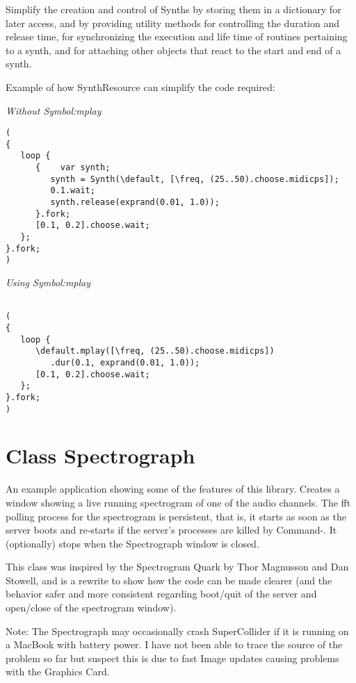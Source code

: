 \documentclass[11pt, a4paper]{scrartcl}
\begin{document}
Simplify the creation and control of Synths by storing them in a dictionary for later access, and by providing utility methods for
controlling the duration and release time, for synchronizing the execution and life time of routines pertaining to a synth, and for attaching other objects that react to the start and end of a synth.

Example of how SynthResource can simplify the code required: 

\emph{Without Symbol:mplay}

\begin{verbatim}
(
{
   loop {
      {    var synth;
         synth = Synth(\default, [\freq, (25..50).choose.midicps]);
         0.1.wait;
         synth.release(exprand(0.01, 1.0));
      }.fork;
      [0.1, 0.2].choose.wait;
   };
}.fork;
)
\end{verbatim}

\emph{Using Symbol:mplay}

\begin{verbatim}

(
{
   loop {
      \default.mplay([\freq, (25..50).choose.midicps])
         .dur(0.1, exprand(0.01, 1.0));
      [0.1, 0.2].choose.wait;
   };
}.fork;
)
\end{verbatim}
\section*{Class Spectrograph}
\label{sec-15}


An example application showing some of the features of this library. Creates a window showing a live running spectrogram of one of the audio channels. The fft polling process for the spectrogram is persistent, that is, it starts as soon as the server boots and re-starts if the server's processes are killed by Command-. It (optionally) stops when the Spectrograph window is closed. 

This class was inspired by the Spectrogram Quark by Thor Magnusson and Dan Stowell, and is a rewrite to show how the code can be made clearer (and the behavior safer and more consistent regarding boot/quit of the server and open/close of the spectrogram window). 

Note: The Spectrograph may occasionally crash SuperCollider if it is running on a MacBook with battery power. I have not been able to trace the source of the problem so far but suspect this is due to fast Image updates causing problems with the Graphics Card.
\end{document}
